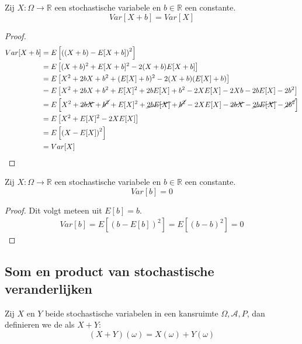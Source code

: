 \documentclass[main.tex]{subfiles}
\begin{document}
\begin{ei}
  Zij $X: \Omega \rightarrow \mathbb{R}$ een stochastische variabele en $b\in \mathbb{R}$ een constante.
  \[ Var[X+b] = Var[X] \]

  \begin{proof}
    \begin{align*}
      Var[X+b]
      &= E\left[\left((X+b) - E[X+b]\right)^{2}\right]\\
      &= E\left[(X+b)^{2} + E[X+b]^{2} -2(X+b)E[X+b]\right]\\
      &= E\left[X^{2} + 2bX+b^{2} + (E[X]+b)^{2} - 2(X+b)(E[X]+b)\right]\\
      &= E\left[X^{2} + 2bX+b^{2} + E[X]^{2} + 2bE[X] + b^{2} - 2XE[X] -2Xb -2bE[X] -2b^{2}\right]\\
      &= E\left[X^{2} + \cancel{2bX} + \cancel{b^{2}} + E[X]^{2} + \cancel{2bE[X]} + \cancel{b^{2}} - 2XE[X] -\cancel{2bX} -\cancel{2bE[X]} - \cancel{2b^{2}}\right]\\
      &= E\left[X^{2} + E[X]^{2} - 2XE[X]\right]\\
      &= E\left[\left(X - E[X]\right)^{2}\right]\\
      &= Var[X]
    \end{align*}
  \end{proof}
\end{ei}

\begin{ei}
  Zij $X: \Omega \rightarrow \mathbb{R}$ een stochastische variabele en $b\in \mathbb{R}$ een constante.
  \[ Var[b] = 0 \]

  \begin{proof}
    Dit volgt meteen uit $E[b] = b$.
    \begin{align*}
      Var[b]
      = E\left[\left(b - E[b]\right)^{2}\right]
      = E\left[(b-b)^{2}\right]
      = 0
    \end{align*}
  \end{proof}
\end{ei}

\subsection{Som en product van stochastische veranderlijken}
\label{sec:som-en-product}

\begin{de}
  Zij $X$ en $Y$ beide stochastische variabelen in een kansruimte $\Omega,\mathcal{A},P$, dan definieren we de  als $X+Y$:
  \[ (X+Y)(\omega) = X(\omega) + Y(\omega) \]
\end{de}
\end{document}
